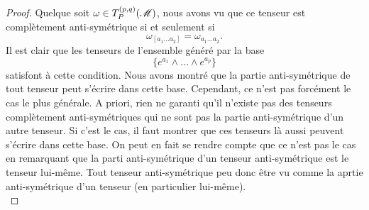 \documentclass[a4paper,11pt]{report}
\begin{document}
            \begin{proof}
                Quelque soit $\omega\in T^{(p,q)}_P(\mathscr{M})$, nous avons vu que ce tenseur est complètement anti-symétrique si et seulement si
                \begin{equation}
                    \omega_{[a_1\dots a_2]} = \omega_{a_1\dots a_2}.
                \end{equation}
                Il est clair que les tenseurs de l'ensemble généré par la base
                \begin{equation}
                    \{e^{a_1}\wedge \dots\wedge e^{a_{p}}\}
                \end{equation}
                satisfont à cette condition. Nous avons montré que la partie anti-symétrique de tout tenseur peut s'écrire dans cette base. Cependant, ce n'est pas forcément le cas le plus générale. A priori, rien ne garanti qu'il n'existe pas des tenseurs complètement anti-symétriques qui ne sont pas la partie anti-symétrique d'un autre tenseur. Si c'est le cas, il faut montrer que ces tenseurs là aussi peuvent s'écrire dans cette base. On peut en fait se rendre compte que ce n'est pas le cas en remarquant que la parti anti-symétrique d'un tenseur anti-symétrique est le tenseur lui-même. Tout tenseur anti-symétrique peu donc être vu comme la aprtie anti-symétrique d'un tenseur (en particulier lui-même).\\
                

\end{proof}
\end{document}
